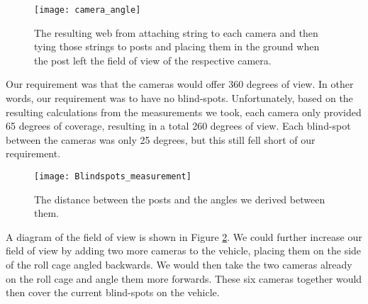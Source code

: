 \begin{figure}[H]
\centerline{\texttt{[image: camera\_angle]}}
\caption[]{The resulting web from attaching string to each camera and then tying those strings to posts and placing them in the ground when the post left the field of view of the respective camera.}
\label{fig:blindspot_verification}
\end{figure}

Our requirement was that the cameras would offer 360 degrees of view.  In other words, our requirement was to have no blind-spots.  Unfortunately, based on the resulting calculations from the measurements we took, each camera only provided 65 degrees of coverage, resulting in a total 260 degrees of view.  Each blind-spot between the cameras was only 25 degrees, but this still fell short of our requirement.

\begin{figure}[H]
\centerline{\texttt{[image: Blindspots\_measurement]}}
\caption[]{The distance between the posts and the angles we derived between them.}
\label{fig:blindspot_measurement}
\end{figure}


A diagram of the field of view is shown in Figure \ref{fig:blindspot_measurement}. We could further increase our field of view by adding two more cameras to the vehicle, placing them on the side of the roll cage angled backwards.  We would then take the two cameras already on the roll cage and angle them more forwards.  These six cameras together would then cover the current blind-spots on the vehicle.